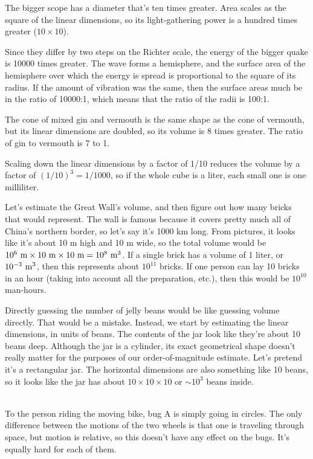 The bigger scope has a diameter that's ten times
greater. Area scales as the square of the linear dimensions,
so its light-gathering power is a hundred times greater ($10\times10$).

Since they differ by two steps on the Richter scale, the
energy of the bigger quake is 10000 times greater. The wave
forms a hemisphere, and the surface area of the hemisphere
over which the energy is spread is proportional to the
square of its radius. If the amount of vibration was the
same, then the surface areas much be in the ratio of
10000:1, which means that the ratio of the radii is 100:1.

The cone of mixed gin and vermouth is the same shape as
the cone of vermouth, but its linear dimensions are doubled,
so its volume is 8 times greater. The ratio of gin
to vermouth is 7 to 1.

Scaling down the linear dimensions by a factor of 1/10 reduces
the volume by a factor of $(1/10)^3=1/1000$, so if the whole cube
is a liter, each small one is one milliliter.

Let's estimate the Great Wall's volume, and then figure out how many
bricks that would represent.
The wall is famous because it covers pretty much all of China's
northern border, so let's say it's 1000 km long. From pictures, it
looks like it's about 10 m high and 10 m wide, so the total volume
would be $10^6\ \munit\times10\ \munit\times10\ \munit=10^8\ \munit^3$.
If a single brick has a volume of 1 liter, or $10^{-3}\ \munit^3$, then
this represents about $10^{11}$ bricks. If one person can lay 10 bricks
in an hour (taking into account all the preparation, etc.), then this
would be $10^{10}$ man-hours.

Directly guessing the number of jelly beans would be like guessing volume directly. That
would be a mistake. Instead, we start by estimating the linear dimensions, in units of
beans. The contents of the jar look like they're about 10 beans deep. Although the jar
is a cylinder, its exact geometrical shape doesn't really matter for the purposes of
our order-of-magnitude estimate. Let's pretend it's a rectangular jar. The horizontal
dimensions are also something like 10 beans, so it looks like the jar has about
$10\times 10 \times 10$ or $\sim 10^3$ beans inside.

\noindent{}\\
To the person riding the moving bike, bug A is simply
going in circles. The only difference between the motions of
the two wheels is that one is traveling through space, but
motion is relative, so this doesn't have any effect on the
bugs. It's equally hard for each of them.

